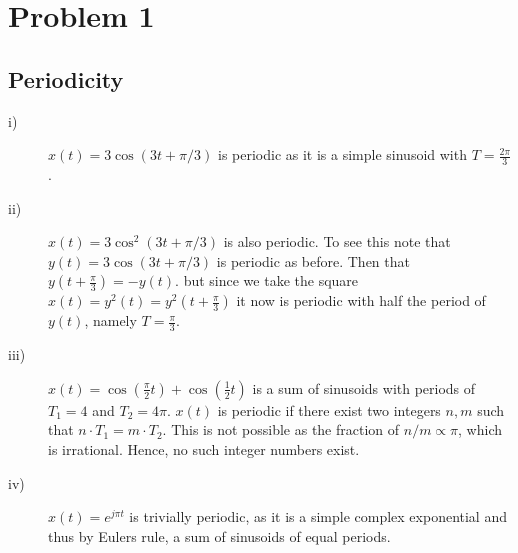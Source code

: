 \section*{Problem 1}
\subsection*{Periodicity}
\begin{description}
    \item[i)] $x(t) = 3\cos(3t + \pi/3)$ is periodic as it is a simple sinusoid with $T=\frac{2\pi}{3}$.
    \item[ii)] $x(t) = 3\cos^2(3t + \pi/3)$ is also periodic. To see this note that $y(t) = 3\cos(3t + \pi/3)$ is periodic as before. Then that $y(t + \frac{\pi}{3}) = -y(t)$. but since we take the square $x(t) = y^2(t) = y^2(t + \frac{\pi}{3})$ it now is periodic with half the period of $y(t)$, namely $T=\frac{\pi}{3}$.
\item[iii)] $x(t) = \cos(\frac{\pi}{2}t) + \cos(\frac{1}{2}t)$ is a sum of sinusoids with periods of $T_1 = 4$ and $T_2 = 4\pi$. $x(t)$ is periodic if there exist two integers $n,m$ such that $n\cdot T_1 = m\cdot T_2$. This is not possible as the fraction of $n/m \propto \pi$, which is irrational. Hence, no such integer numbers exist.

\item[iv)] $x(t) = e^{j\pi t}$ is trivially periodic, as it is a simple complex exponential and thus by Eulers rule, a sum of sinusoids of equal periods.
\end{description}

